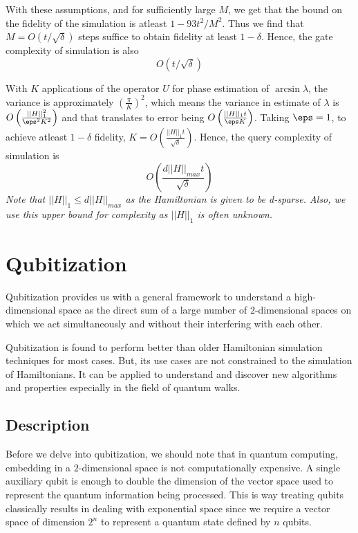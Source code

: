 \documentclass[
10pt, %
a4paper, %
oneside, %
headinclude,footinclude, %
BCOR5mm, %
]{scrartcl}
\begin{document}
With these assumptions, and for sufficiently large $M$, we get that the bound on the fidelity of the simulation is atleast $1 - 93t^2/M^2$. Thus we find that $M = O(t/\sqrt \delta)$ steps suffice to obtain fidelity at least $1-\delta$. Hence, the gate complexity of simulation is also
$$O(t/\sqrt \delta)$$

With $K$ applications of the operator $U$ for phase estimation of $\arcsin\lambda$, the variance is approximately $\left(\frac{\pi}{K}\right)^2$, which means the variance in estimate of $\lambda$ is $O\left(\frac{||H||_1^2}{\eps^2K^2}\right)$ and that translates to error being $O\left(\frac{||H||_1t}{\eps K}\right)$. Taking $\eps=1$, to achieve atleast $1-\delta$ fidelity, $K=O\left(\frac{||H||_1t}{\sqrt\delta}\right)$. Hence, the query complexity of simulation is
$$O\left(\frac{d||H||_{max}t}{\sqrt\delta}\right)$$
\textit{Note that $||H||_1\le d||H||_{max}$ as the Hamiltonian is given to be d-sparse. Also, we use this upper bound for complexity as $||H||_1$ is often unknown.}



\section{Qubitization}
Qubitization provides us with a general framework to understand a high-dimensional space as the direct sum of a large number of $2$-dimensional spaces on which we act simultaneously and without their interfering with each other.\newline

Qubitization is found to perform better than older Hamiltonian simulation techniques for most cases. But, its use cases are not constrained to the simulation of Hamiltonians. It can be applied to understand and discover new algorithms and properties especially in the field of quantum walks.

\subsection{Description}
Before we delve into qubitization, we should note that in quantum computing, embedding in a $2$-dimensional space is not computationally expensive. A single auxiliary qubit is enough to double the dimension of the vector space used to represent the quantum information being processed. This is way treating qubits classically results in dealing with exponential space since we require a vector space of dimension $2^n$ to represent a quantum state defined by $n$ qubits.\newline
\end{document}
